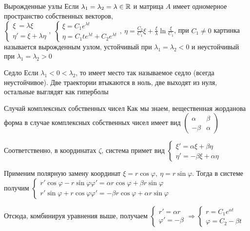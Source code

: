 \documentclass[12pt]{article}
\begin{document}
\begin{defin}{Вырожденные узлы}
    Если $\lambda_1 = \lambda_2 = \lambda \in \mathbb R$ и матрица $A$ имеет одномерное пространство собственных векторов, $\begin{cases}
        \xi\ = \lambda \xi \\
        \eta' = \xi + \lambda \eta 
    \end{cases},\ \begin{cases}
        \xi = C_1 e^{\lambda t} \\ 
        \eta = C_1 t e^{\lambda t} + C_2 e^{\lambda t}
    \end{cases},\ \eta = \frac{C_2}{C_1} \xi + \frac{\xi}{\lambda} \ln{\frac{\xi}{C_1}}$, при $C_1 \neq 0$ картинка называется вырожденным узлом, устойчивый при $\lambda_1 = \lambda_2 < 0$ и неустойчивый при $\lambda_1 = \lambda_2 > 0$
\end{defin}

\begin{defin}{Седло}
    Если $\lambda_1 < 0 < \lambda_2$, то имеет место так называемое седло (всегда неустойчивое). Две траектории втыкаются в ноль, две выходят из нуля, остальные выглядят как гиперболы
\end{defin}

\begin{Remark}{Случай комплексных собственных чисел}
    Как мы знаем, вещественная жорданова форма в случае комплексных собственных чисел имеет вид $\begin{pmatrix}
        \alpha & \beta \\
        -\beta & \alpha
    \end{pmatrix}$

    Соответственно, в координатах $\zeta$, система примет вид $\begin{cases}
        \xi' = \alpha \xi + \beta \eta \\
        \eta' = -\beta \xi + \alpha \eta
    \end{cases}$

    Применим полярную замену координат $\xi = r\cos\varphi,\ \eta = r\sin\varphi$. Тогда в системе получим $\begin{cases}
        r'\cos\varphi - r\sin\varphi\varphi' = \alpha r\cos\varphi + \beta r\sin\varphi \\
        r'\sin\varphi + r\cos\varphi\varphi' = -\beta r\cos\varphi + \alpha r\sin\varphi
    \end{cases}$

    Отсюда, комбинируя уравнения выше, получаем $\begin{cases}
        r' = \alpha r \\
        \varphi' = -\beta 
    \end{cases} \Rightarrow \begin{cases}
        r = C_1 e^{\alpha t} \\
        \varphi = C_2 - \beta t
    \end{cases}$
\end{Remark}
\end{document}
